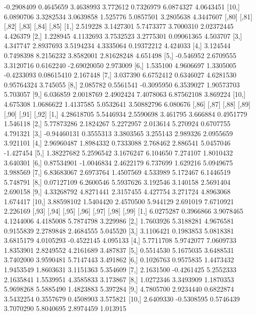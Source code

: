 \documentclass[12pt]{article}
\begin{document}
\begin{Schunk}
\begin{Soutput}
 [9,] -0.2908409 0.4645659 3.4638993  3.772612 0.7326979 6.0874327 4.0643451
[10,]  6.0890706 3.3282534 3.0639858  1.525776 5.0857501 3.2805638 4.3447607
          [,80]     [,81]      [,82]      [,83]       [,84]    [,85]
 [1,]  2.519228 3.1427301  5.7473377  3.7000310  2.02372445 4.426379
 [2,]  1.228945 4.1132693  3.7532523  3.2775301  0.09061365 4.503707
 [3,]  4.347747 2.8937693  3.5194234  4.3335064  0.19372212 4.424033
 [4,]  3.124544 0.7498398  8.2156232  3.8582001  2.81628248 4.651498
 [5,] -0.546952 2.6709555  3.3120716  0.6162240 -2.69020050 2.973009
 [6,]  1.535100 4.9606697  1.3305005 -0.4233093  0.08615410 2.167448
 [7,]  3.037390 6.6752412  0.6346027  4.6281530  0.95764324 3.745055
 [8,]  2.085782 0.5561541 -0.3095950  6.3539027  1.90573703 5.703057
 [9,]  6.036859 2.0018769  2.4902424  7.4078063  6.87562108 3.869224
[10,]  4.675308 1.0686622  1.4137585  5.0532641  3.50882796 6.080676
            [,86]      [,87]     [,88]    [,89]    [,90]     [,91]     [,92]
 [1,]  4.28618705  5.5446934 2.5590698 3.461795 3.666884 0.4951779  1.546118
 [2,]  5.77873286  2.1824267 5.2272957 2.013614 5.270924 0.6707755  4.791321
 [3,] -0.94460131  0.3555313 3.3803565 3.255143 2.989326 2.0955659  3.921101
 [4,]  2.96960487  1.8984332 0.7333088 2.768462 2.886541 5.0457046 -1.427454
 [5,]  1.38227682  5.2596542 3.1676247 6.104650 7.274107 1.8010432  3.640301
 [6,]  0.87534901 -1.0046834 2.4622179 6.737699 1.629216 5.0949675  3.988569
 [7,]  6.83683067  2.6973764 1.4507569 4.533989 5.172467 6.1446519  5.748791
 [8,]  0.07127109  6.2600546 5.5937626 3.192546 3.140158 2.5691404  2.690158
 [9,]  4.33268792  4.8271441 2.3157455 4.427754 3.271724 4.8963068  1.674417
[10,]  3.88598102  1.5404420 2.4570500 5.944129 2.691019 7.6710921  2.226169
          [,93]      [,94]     [,95]     [,96]     [,97]      [,98]    [,99]
 [1,] 6.0275287  0.3966866 3.9078465 4.1244006 4.4185008  5.7874798 3.229986
 [2,] 1.7603926  5.3188281 4.9676581 0.9155839 2.2789848  2.4684555 5.045520
 [3,] 3.1106421  0.1983853 5.0818381 3.6815179 4.0105293 -0.4522145 4.095133
 [4,] 5.7711708  5.9742077 7.0609733 1.8353901 2.8249552  4.2161689 3.487837
 [5,] 0.5514530  5.1675035 3.6488531 3.7402000 3.9590481  5.7147443 3.491862
 [6,] 0.1026763  0.9575835 1.4473432 1.9453549 1.8603631  3.1151363 5.354609
 [7,] 2.1631500 -0.4261425 5.2552333 2.1635841 1.5539951  4.3585833 3.173867
 [8,] 1.0272346  3.3493909 1.1870353 5.9698268 5.5885490  1.4823883 5.397284
 [9,] 4.7805700  2.9234440 0.6822874 3.5432254 0.3557679  0.4508903 3.575821
[10,] 2.6409330 -0.5308595 0.5746439 3.7070290 5.8040695  2.8974459 1.013915

\end{Soutput}
\end{Schunk}
\end{document}
